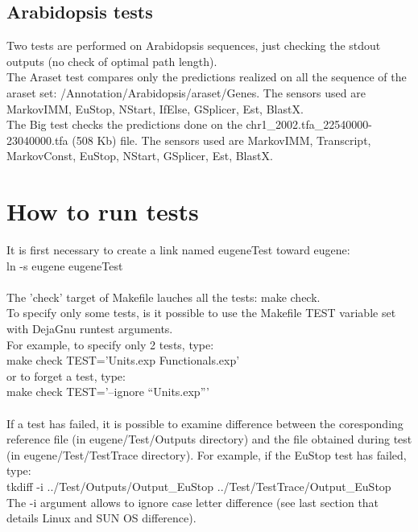 \documentclass[a4paper,11pt]{article}
\begin{document}
\subsection{Arabidopsis tests}
Two tests are performed on Arabidopsis sequences, just checking the stdout outputs (no check of optimal path length).\\
The Araset test compares only the predictions realized on all the sequence of the araset set: /Annotation/Arabidopsis/araset/Genes. The sensors used are MarkovIMM, EuStop, NStart, IfElse, GSplicer, Est, BlastX.\\
The Big test checks the predictions done on the chr1\_2002.tfa\_22540000-23040000.tfa (508 Kb) file. The sensors used are MarkovIMM, Transcript, MarkovConst, EuStop, NStart, GSplicer, Est, BlastX.\\


\section{How to run tests}
It is first necessary to create a link named eugeneTest toward eugene:\\
         {\sf ln -s eugene eugeneTest}\\
\\
The 'check' target of Makefile lauches all the tests: {\sf make check}.\\
To specify only some tests, is it possible to use the Makefile TEST variable set with DejaGnu runtest arguments.\\
For example, to specify only 2 tests, type: \\
{\sf make check TEST='Units.exp Functionals.exp'} \\
or to forget a test, type: \\
{\sf make check TEST='--ignore ``Units.exp'''}\\
\\
If a test has failed, it is possible to examine difference between the coresponding
 reference file (in eugene/Test/Outputs directory) and the file obtained during test 
 (in eugene/Test/TestTrace directory).
For example, if the EuStop test has failed, type: \\
{\sf tkdiff -i ../Test/Outputs/Output\_EuStop ../Test/TestTrace/Output\_EuStop}\\
The -i argument allows to ignore case letter difference (see last section that details Linux and SUN OS difference).
\end{document}

